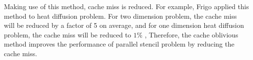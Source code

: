 Making use of this method, cache miss is reduced. For example, Frigo \cite{Frigo2007} applied this method to heat diffusion problem.
For two dimension problem, the cache miss will be reduced by a factor of 5 on average, 
and for one dimension heat diffusion problem, the cache miss will be reduced to $1\%$ \cite{Frigo2007},
Therefore, the cache oblivious method improves the performance of parallel stencil problem by reducing the cache miss.



